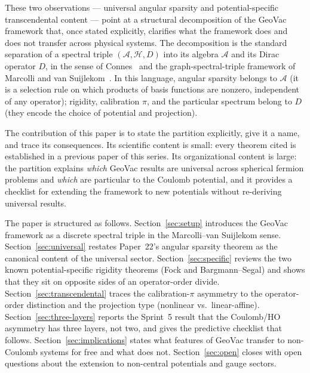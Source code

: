 \documentclass[twocolumn,pra,amsmath,amssymb,superscriptaddress]{revtex4-2}
\begin{document}
These two observations --- universal angular sparsity and
potential-specific transcendental content --- point at a structural
decomposition of the GeoVac framework that, once stated explicitly,
clarifies what the framework does and does not transfer across
physical systems.  The decomposition is the standard separation of a
spectral triple $(\mathcal{A}, \mathcal{H}, D)$ into its algebra
$\mathcal{A}$ and its Dirac operator $D$, in the sense of
Connes~\cite{connes_book1994} and the graph-spectral-triple framework
of Marcolli and van Suijlekom~\cite{marcolli_vs2014}.  In this
language, angular sparsity belongs to $\mathcal{A}$ (it is a
selection rule on which products of basis functions are nonzero,
independent of any operator); rigidity, calibration $\pi$, and the
particular spectrum belong to $D$ (they encode the choice of
potential and projection).

The contribution of this paper is to state the partition explicitly,
give it a name, and trace its consequences.  Its scientific content
is small: every theorem cited is established in a previous paper of
this series.  Its organizational content is large: the partition
explains \emph{which} GeoVac results are universal across spherical
fermion problems and \emph{which} are particular to the Coulomb
potential, and it provides a checklist for extending the framework
to new potentials without re-deriving universal results.

The paper is structured as follows.
Section~\ref{sec:setup} introduces the GeoVac framework as a discrete
spectral triple in the Marcolli--van Suijlekom sense.
Section~\ref{sec:universal} restates Paper~22's angular sparsity
theorem as the canonical content of the universal sector.
Section~\ref{sec:specific} reviews the two known potential-specific
rigidity theorems (Fock and Bargmann--Segal) and shows that they sit
on opposite sides of an operator-order divide.
Section~\ref{sec:transcendental} traces the calibration-$\pi$
asymmetry to the operator-order distinction and the projection type
(nonlinear vs.\ linear-affine).
Section~\ref{sec:three-layers} reports the Sprint~5 result that the
Coulomb/HO asymmetry has three layers, not two, and gives the
predictive checklist that follows.
Section~\ref{sec:implications} states what features of GeoVac
transfer to non-Coulomb systems for free and what does not.
Section~\ref{sec:open} closes with open questions about the
extension to non-central potentials and gauge sectors.
\end{document}
